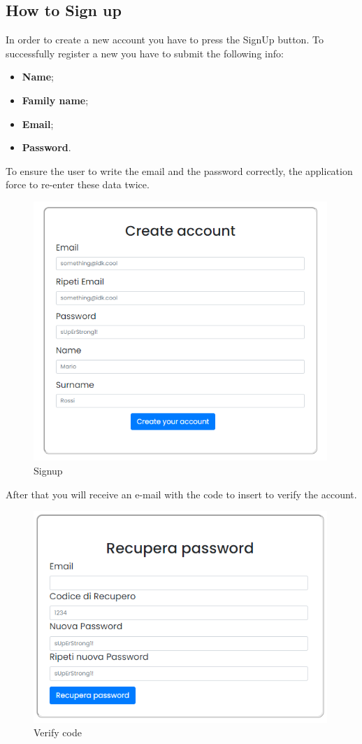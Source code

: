 \subsection{How to Sign up} \label{_signup}
In order to create a new account you have to press the SignUp button. To successfully register a new you have to submit the following info:
\begin{itemize} 
    \item \textbf{Name};
    \item \textbf{Family name};
    \item \textbf{Email};
    \item \textbf{Password}. 
\end{itemize}
To ensure the user to write the email and the password correctly, the application force to re-enter these data twice.

\begin{figure}[H]
    \centering
    \includegraphics[width=30em]{res/images/cliente/signup.png}
    \caption{Signup}
\end{figure}

After that you will receive an e-mail with the code to insert to verify the account.

\begin{figure}[H]
    \centering
    \includegraphics[width=30em]{res/images/cliente/verify.png}
    \caption{Verify code}
\end{figure}


